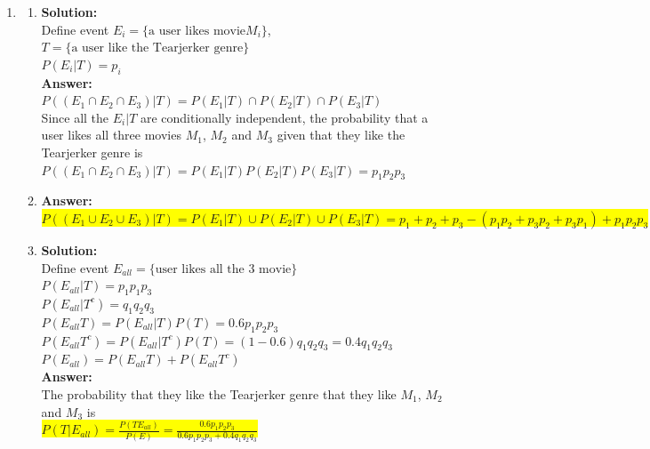 \documentclass{article}
\newcommand{\myansw}{\textbf{Answer:}\\}
\newcommand{\mysolu}{\textbf{Solution:}\\}
\begin{document}
\begin{enumerate}
\begin{enumerate}
		${P(G^c)=\frac{48\times 47}{52\times 51}=0.851}$\\
		${P(G)=1-P(G^c)=0.149}$\\
		\myansw
		\colorbox{yellow}{
			${P(E|G)=\frac{P(EG)}{P(G)}=\frac{P(E)}{P(G)}=0.0303}$
		}\\
	\end{enumerate}
	\item
	\begin{enumerate}
		\item
		\mysolu
		Define event ${E_i=\{\text{a user likes movie} M_i\}}$,${T=\{\text{a user like the Tearjerker genre}\}}$\\
		${P(E_i|T)=p_i}$\\
		\myansw
		${P((E_1 \cap E_2 \cap E_3)|T)=P(E_1|T)\cap P(E_2|T)\cap P(E_3|T)}$\\
		Since all the ${E_i|T}$ are conditionally independent, the probability that a user likes all three movies $M_1$, $M_2$ and $M_3$ given that they like the Tearjerker genre is\\
		${P((E_1 \cap E_2 \cap E_3)|T)=P(E_1|T)P(E_2|T)P(E_3|T)=p_1 p_2 p_3}$
		\item
		\myansw
		\colorbox{yellow}{
			${P((E_1 \cup E_2 \cup E_3)|T)=P(E_1|T) \cup P(E_2|T) \cup P(E_3|T) = p_1+p_2+p_3 - (p_1 p_2+p_3 p_2+p_3 p_1)+p_1p_2p_3}$
		}\\
		\item
		\mysolu
		Define event ${E_{all}=\{\text{user likes all the 3 movie}\}}$\\
		${P(E_{all}|T)=p_1 p_1 p_3}$\\
		${P(E_{all}|T^c)=q_1 q_2 q_3}$\\
		${P(E_{all}T)=P(E_{all}|T)P(T)=0.6 p_1 p_2 p_3}$\\
		${P(E_{all}T^c)=P(E_{all}|T^c)P(T)=(1-0.6) q_1 q_2 q_3=0.4 q_1 q_2 q_3 }$\\
		${P(E_{all})=P(E_{all}T)+P(E_{all}T^c)}$\\
		\myansw
		The probability that they like the Tearjerker genre that they like $M_1$, $M_2$ and $M_3$ is\\
		\colorbox{yellow}{
			${P(T|E_{all})=\frac{P(TE_{all})}{P(E)}=\frac{0.6 p_1 p_2 p_3}{0.6 p_1 p_2 p_3+0.4 q_1 q_2 q_3}}$
		}\\
		

\end{enumerate}
\end{enumerate}
\end{document}
